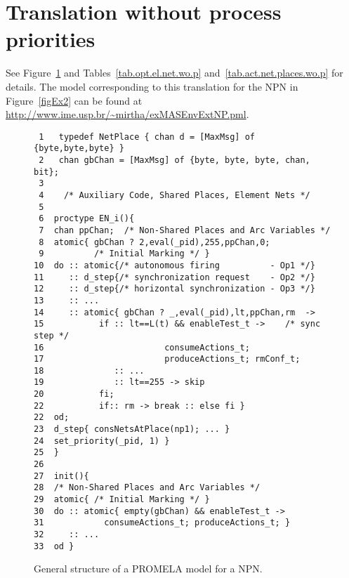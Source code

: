 \documentclass{llncs}
\begin{document}
\newpage

\section{Translation without process priorities}
\label{app:alt.trans}

See Figure~\ref{figStructNPNwoP} and Tables~\ref{tab.opt.el.net.wo.p} and~\ref{tab.act.net.places.wo.p} for details. The model corresponding to this translation for the NPN in Figure~\ref{figEx2} can be found at \small\url{http://www.ime.usp.br/~mirtha/exMASEnvExtNP.pml}\nfont.

\mfont
\begin{figure}[h!]
\begin{center}
\begin{verbatim}
 1   typedef NetPlace { chan d = [MaxMsg] of {byte,byte,byte} }
 2   chan gbChan = [MaxMsg] of {byte, byte, byte, chan, bit};
 3
 4    /* Auxiliary Code, Shared Places, Element Nets */
 5
 6  proctype EN_i(){
 7  chan ppChan;  /* Non-Shared Places and Arc Variables */
 8  atomic{ gbChan ? 2,eval(_pid),255,ppChan,0;
 9          /* Initial Marking */ }
10  do :: atomic{/* autonomous firing          - Op1 */}
11     :: d_step{/* synchronization request    - Op2 */}
12     :: d_step{/* horizontal synchronization - Op3 */}
13     :: ...
14     :: atomic{ gbChan ? _,eval(_pid),lt,ppChan,rm  ->
15           if :: lt==L(t) && enableTest_t ->    /* sync step */
16                        consumeActions_t;
17                        produceActions_t; rmConf_t;
18              :: ...
19              :: lt==255 -> skip
20           fi;
22           if:: rm -> break :: else fi }
22  od;
23  d_step{ consNetsAtPlace(np1); ... }
24  set_priority(_pid, 1) }
25  }
26
27  init(){
28  /* Non-Shared Places and Arc Variables */
29  atomic{ /* Initial Marking */ }
30  do :: atomic{ empty(gbChan) && enableTest_t ->
31            consumeActions_t; produceActions_t; }
32     :: ...
33  od }
\end{verbatim}
\end{center}
\vspace{-5pt}
\caption{General structure of a PROMELA model for a NPN.}
\label{figStructNPNwoP}
\end{figure}
\nfont
\end{document}
